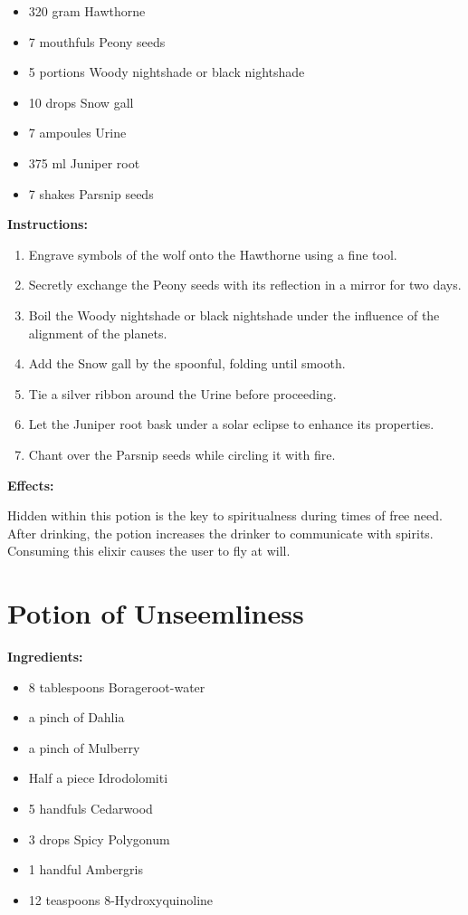 \documentclass{article}
\begin{document}
\begin{itemize}
  \item 320 gram Hawthorne
  \item 7 mouthfuls Peony seeds
  \item 5 portions Woody nightshade or black nightshade
  \item 10 drops Snow gall
  \item 7 ampoules Urine
  \item 375 ml Juniper root
  \item 7 shakes Parsnip seeds
\end{itemize}

\textbf{Instructions:}

\begin{enumerate}
  \item Engrave symbols of the wolf onto the Hawthorne using a fine tool.
  \item Secretly exchange the Peony seeds with its reflection in a mirror for two days.
  \item Boil the Woody nightshade or black nightshade under the influence of the alignment of the planets.
  \item Add the Snow gall by the spoonful, folding until smooth.
  \item Tie a silver ribbon around the Urine before proceeding.
  \item Let the Juniper root bask under a solar eclipse to enhance its properties.
  \item Chant over the Parsnip seeds while circling it with fire.
\end{enumerate}

\textbf{Effects:}

Hidden within this potion is the key to spiritualness during times of free need. After drinking, the potion increases the drinker to communicate with spirits. Consuming this elixir causes the user to fly at will.

\newpage
\section*{Potion of Unseemliness}

\textbf{Ingredients:}

\begin{itemize}
  \item 8 tablespoons Borageroot-water
  \item a pinch of Dahlia
  \item a pinch of Mulberry
  \item Half a piece Idrodolomiti
  \item 5 handfuls Cedarwood
  \item 3 drops Spicy Polygonum
  \item 1 handful Ambergris
  \item 12 teaspoons 8-Hydroxyquinoline
\end{itemize}
\end{document}
